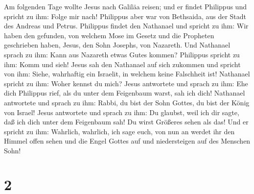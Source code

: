  Am folgenden Tage wollte Jesus nach Galiläa reisen; und
er findet Philippus und spricht zu ihm: Folge mir nach! 
Philippus aber war von Bethsaida, aus der Stadt des Andreas und Petrus.
 Philippus findet den Nathanael und spricht zu ihm: Wir
haben den gefunden, von welchem Mose im Gesetz und die Propheten
geschrieben haben, Jesus, den Sohn Josephs, von Nazareth.
 Und Nathanael sprach zu ihm: Kann aus Nazareth etwas
Gutes kommen? Philippus spricht zu ihm: Komm und sieh! 
Jesus sah den Nathanael auf sich zukommen und spricht von ihm: Siehe,
wahrhaftig ein Israelit, in welchem keine Falschheit ist!
 Nathanael spricht zu ihm: Woher kennst du mich? Jesus
antwortete und sprach zu ihm: Ehe dich Philippus rief, als du unter dem
Feigenbaum warst, sah ich dich!  Nathanael antwortete und
sprach zu ihm: Rabbi, du bist der Sohn Gottes, du bist der König von
Israel!  Jesus antwortete und sprach zu ihm: Du glaubst,
weil ich dir sagte, daß ich dich unter dem Feigenbaum sah! Du wirst
Größeres sehen als das!  Und er spricht zu ihm: Wahrlich,
wahrlich, ich sage euch, von nun an werdet ihr den Himmel offen sehen
und die Engel Gottes auf und niedersteigen auf des Menschen Sohn!

\hypertarget{section-1}{%
\section{2}\label{section-1}}

